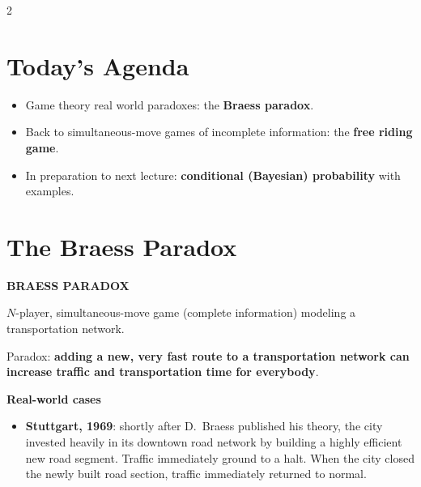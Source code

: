 \documentclass[a4paper,9pt]{extarticle}
\begin{document}

\thispagestyle{fancy}



\begin{multicols}{2}



\section{Today's Agenda}


\begin{itemize}

\item Game theory real world paradoxes: the \textbf{Braess paradox}.

\item Back to simultaneous-move games of incomplete information: the \textbf{free riding
game}.

\item In preparation to next lecture: \textbf{conditional (Bayesian) probability} with
examples.

\end{itemize}


\section{The Braess Paradox}


\begin{definition}

\textbf{BRAESS PARADOX}

$N$-player, simultaneous-move game (complete information) modeling a transportation network.

Paradox: \textbf{adding a new, very fast route to a transportation network can increase
traffic and transportation time for everybody}.

\end{definition}


\begin{example}

\textbf{Real-world cases}

\begin{itemize}

\item \textbf{Stuttgart, 1969}: shortly after D.\ Braess published his theory, the city
invested heavily in its downtown road network by building a highly efficient new road
segment. Traffic immediately ground to a halt. When the city closed the newly built road
section, traffic immediately returned to normal.


\end{itemize}
\end{example}
\end{multicols}
\end{document}
